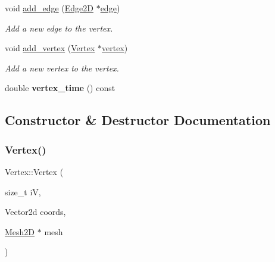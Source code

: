 \begin{DoxyCompactItemize}
void \hyperlink{classMeshFramework2D_1_1Vertex_a53f4e4ab9c982beb50fe635ee8ad4a81}{add\+\_\+edge} (\hyperlink{classMeshFramework2D_1_1Edge2D}{Edge2D} $\ast$\hyperlink{classMeshFramework2D_1_1Vertex_ac8647b9c20119dcffc9112381b16c221}{edge})
\begin{DoxyCompactList}\small\item\em Add a new edge to the vertex. \end{DoxyCompactList}\item 
\mbox{\label{classMeshFramework2D_1_1Vertex_aeffe35d0d60a1ee284f645a5642ff75c}} 
void \hyperlink{classMeshFramework2D_1_1Vertex_aeffe35d0d60a1ee284f645a5642ff75c}{add\+\_\+vertex} (\hyperlink{classMeshFramework2D_1_1Vertex}{Vertex} $\ast$\hyperlink{classMeshFramework2D_1_1Vertex_ae4d861f137a630bb3fde25acf03198ed}{vertex})
\begin{DoxyCompactList}\small\item\em Add a new vertex to the vertex. \end{DoxyCompactList}\item 
\mbox{\label{classMeshFramework2D_1_1Vertex_a6fdf957faa3b0240acfe21c9fef9ea42}} 
double {\bfseries vertex\+\_\+time} () const
\end{DoxyCompactItemize}


\subsection{Constructor \& Destructor Documentation}
\mbox{\label{classMeshFramework2D_1_1Vertex_ae7a124df57a1c34455041e9fbe56ac06}} 
\subsubsection{\texorpdfstring{Vertex()}{Vertex()}}
{\footnotesize\ttfamily Vertex\+::\+Vertex (\begin{DoxyParamCaption}\item[{size\+\_\+t}]{iV,  }\item[{Vector2d}]{coords,  }\item[{\hyperlink{classMeshFramework2D_1_1Mesh2D}{Mesh2D} $\ast$}]{mesh }\end{DoxyParamCaption})}

